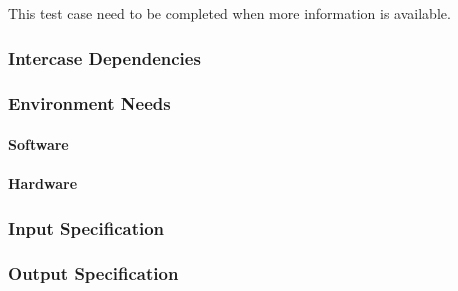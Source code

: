 This test case need to be completed when more information is available.



\subsubsection{Intercase Dependencies}

\subsubsection{Environment Needs}

\paragraph{Software}

\paragraph{Hardware}

\subsubsection{Input Specification}

\subsubsection{Output Specification}

